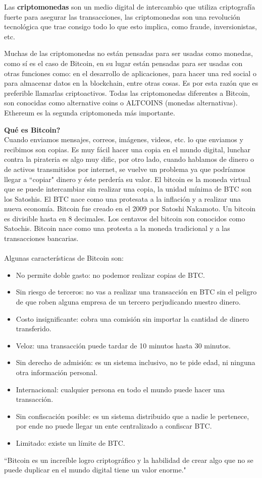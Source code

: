 \documentclass[a4paper,12pt]{/home/armando/Documentos/Cursos/LaTeX/Plantillas/lib/pub}
\begin{document}
Las \textbf{criptomonedas} son un medio digital de intercambio que utiliza criptografía fuerte para asegurar las transacciones, 
las criptomonedas son una revolución tecnológica que trae consigo todo lo que esto implica, como fraude, inversionistas, etc.

Muchas de las criptomonedas no están pensadas para ser usadas como monedas, como sí es el caso de Bitcoin, en su lugar están pensadas para ser usadas con otras funciones como: en el desarrollo de aplicaciones, para hacer una red social o para almacenar datos en la blockchain, entre otras cosas. Es por esta razón que es preferible llamarlas criptoactivos.
Todas las criptomonedas diferentes a Bitcoin, son conocidas como alternative coins o ALTCOINS (monedas alternativas).\\
Ethereum es la segunda criptomoneda más importante.

\textbf{Qué es Bitcoin?}\\
Cuando enviamos mensajes, correos, imágenes, videos, etc. lo que enviamos y recibimos son copias. Es muy fácil hacer una copia en el mundo digital, lunchar contra la pirateria es algo muy dific, por otro lado, cuando hablamos de dinero o de activos transmitidos por internet, se vuelve un problema ya que podríamos llegar a ``copiar" dinero y éste perdería su valor.
El bitcoin es la moneda virtual que se puede intercambiar sin realizar una copia, la unidad mínima de BTC son los Satoshis. El BTC nace como una protesata a la inflación y a realizar una nueva economía.
Bitcoin fue creado en el 2009 por Satoshi Nakamoto. Un bitcoin es divisible hasta en 8 decimales. Los centavos del bitcoin son conocidos como Satochis. Bitcoin nace como una protesta a la moneda tradicional y a las transacciones bancarias.\\\\
Algunas características de Bitcoin son:
\begin{itemize}
	\item No permite doble gasto: no podemor realizar copias de BTC.
	\item Sin riesgo de terceros: no vas a realizar una transacción en BTC sin el peligro de que roben alguna empresa de un tercero perjudicando nuestro dinero.
	\item Costo insignificante: cobra una comisión sin importar la cantidad de dinero transferido.
	\item Veloz: una transacción puede tardar de 10 minutos hasta 30 minutos.
	\item Sin derecho de admisión: es un sistema inclusivo, no te pide edad, ni ninguna otra información personal.
	\item Internacional: cualquier persona en todo el mundo puede hacer una transacción.
	\item Sin confiscación posible: es un sistema distribuido que a nadie le pertenece, por ende no puede llegar un ente centralizado a confiscar BTC.
	\item Limitado: existe un límite de BTC.
\end{itemize}
``Bitcoin es un increíble logro criptográfico y la habilidad de crear algo que no se puede duplicar en el mundo digital tiene un valor enorme."
\end{document}
